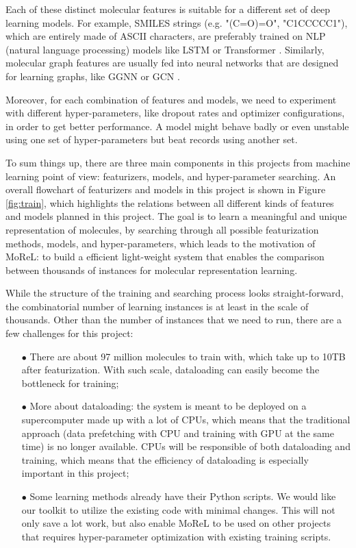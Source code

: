 \documentclass[conference]{IEEEtran}
\begin{document}
Each of these distinct molecular features is suitable for a different set of deep learning models. 
For example, SMILES strings (e.g. "(C=O)=O", "C1CCCCC1"), which are entirely made of ASCII characters, are preferably trained on NLP (natural language processing) models like LSTM \cite{lstm} or Transformer \cite{transformer}. 
Similarly, molecular graph features are usually fed into neural networks that are designed for learning graphs, like GGNN \cite{ggnn} or GCN \cite{gcn}. 

Moreover, for each combination of features and models, we need to experiment with different hyper-parameters, like dropout rates and optimizer configurations, in order to get better performance. 
A model might behave badly or even unstable using one set of hyper-parameters but beat records using another set. 

To sum things up, there are three main components in this projects from machine learning point of view: featurizers, models, and hyper-parameter searching. 
An overall flowchart of featurizers and models in this project is shown in Figure \ref{fig:train}, which highlights the relations between all different kinds of features and models planned in this project. 
The goal is to learn a meaningful and unique representation of molecules, by searching through all possible featurization methods, models, and hyper-parameters, which leads to the motivation of MoReL: to build a efficient light-weight system that enables the comparison between thousands of instances for molecular representation learning.

While the structure of the training and searching process looks straight-forward, the combinatorial number of learning instances is at least in the scale of thousands. 
Other than the number of instances that we need to run, there are a few challenges for this project:
\begin{itemize}
	\item[$\bullet$]  There are about 97 million molecules to train with, which take up to 10TB after featurization. With such scale, dataloading can easily become the bottleneck for training;
	\item[$\bullet$]  More about dataloading: the system is meant to be deployed on a supercomputer made up with a lot of CPUs, which means that the traditional approach (data prefetching with CPU and training with GPU at the same time) is no longer available. CPUs will be responsible of both dataloading and training, which means that the efficiency of dataloading is especially important in this project;
	\item[$\bullet$]  Some learning methods already have their Python scripts. We would like our toolkit to utilize the existing code with minimal changes. This will not only save a lot work, but also enable MoReL to be used on other projects that requires hyper-parameter optimization with existing training scripts. 
\end{itemize}
\end{document}
